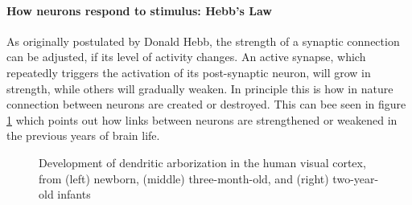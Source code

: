 \paragraph{How neurons respond to stimulus: Hebb's Law}
 As originally postulated by Donald Hebb, the strength of a synaptic connection can be adjusted, if its level of activity changes. An active synapse, which repeatedly triggers the activation of its post-synaptic neuron, will grow in strength, while others will gradually weaken.
 In principle this is how in nature connection between neurons are created or destroyed. This can bee seen in figure \ref{fig:Arborization} which points out how links between neurons are strengthened or weakened in the previous years of brain life.
 \begin{figure}[h!t]
\centering
{}
\caption {Development of dendritic arborization in the human visual cortex, from
(left) newborn, (middle) three-month-old, and (right) two-year-old infants }
\label{fig:Arborization}
\end{figure}


